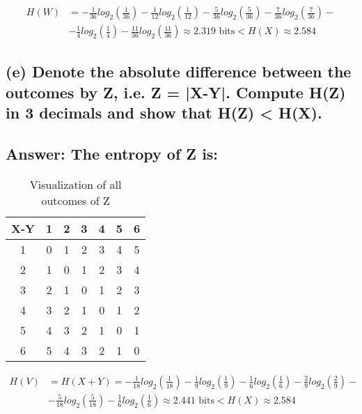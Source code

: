 \documentclass[15px]{article}
\begin{document}
\begin{equation}
\begin{split}
H(W) & = -\frac{1}{36}log_2(\frac{1}{36}) - \frac{1}{12}log_2(\frac{1}{12}) - \frac{5}{36}log_2(\frac{5}{36}) - \frac{7}{36}log_2(\frac{7}{36}) - \\
& - \frac{1}{4}log_2(\frac{1}{4}) - \frac{11}{36}log_2(\frac{11}{36}) \approx 2.319 \text{ bits} < H(X) \approx 2.584
\end{split}
\end{equation}

\subsection*{\normalfont (e) Denote the absolute difference between the outcomes by Z, i.e. Z = |X-Y|. Compute H(Z) in 3 decimals and show that H(Z) < H(X).}

\subsection*{ Answer: The entropy of Z is:}

\begin{table}[ht]
\centering
\begin{adjustbox}{width=0.5\linewidth}
\begin{tabular}{|c|c|c|c|c|c|c|}
\hline
X-Y & 1 & 2 & 3 & 4 & 5 & 6 \\ \hline
1 & 0 & 1 & 2 & 3 & 4 & 5 \\ \hline
2 & 1 & 0 & 1 & 2 & 3 & 4 \\ \hline
3 & 2 & 1 & 0 & 1 & 2 & 3\\ \hline
4 & 3 & 2 & 1 & 0 & 1 & 2\\ \hline
5 & 4 & 3 & 2 & 1 & 0 & 1\\ \hline
6 & 5 & 4 & 3 & 2 & 1 & 0\\ \hline
\end{tabular}
\end{adjustbox}
\caption{Visualization of all outcomes of Z} 
\end{table}

\begin{equation}
\begin{split}
H(V) & = H(X+Y) = -\frac{1}{18}log_2(\frac{1}{18}) - \frac{1}{9}log_2(\frac{1}{9}) - \frac{1}{6}log_2(\frac{1}{6}) - \frac{2}{9}log_2(\frac{2}{9}) - \\ 
& - \frac{5}{18}log_2(\frac{5}{18}) - \frac{1}{6}log_2(\frac{1}{6}) \approx 2.441 \text{ bits} < H(X) \approx 2.584
\end{split}
\end{equation}
\end{document}

